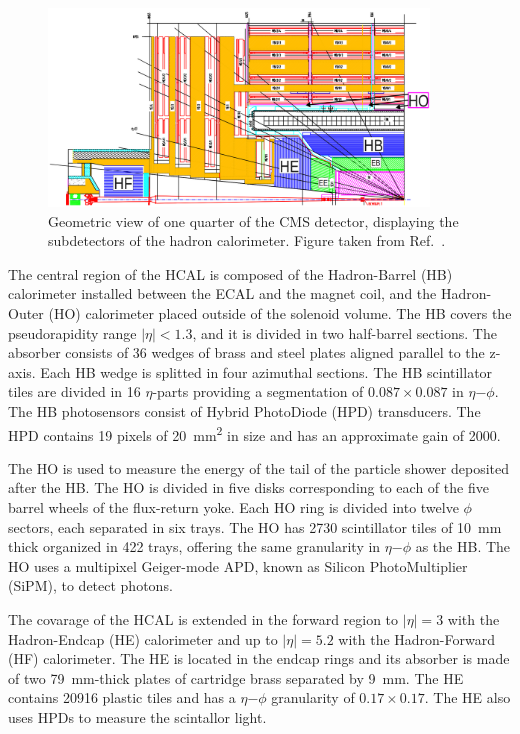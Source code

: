 \begin{figure}[!htbp]
 \begin{center}
  \includegraphics[width=0.9\textwidth]{Figures/Experiment/CMS/HCAL.png}
 \end{center}
 \caption{Geometric view of one quarter of the CMS detector, displaying the subdetectors of the hadron calorimeter. Figure taken from Ref.~\cite{CMSHCALUpgrade}.}
 \label{fig:CMS_HCAL}
\end{figure}

The central region of the HCAL is composed of the Hadron-Barrel (HB) calorimeter installed between the ECAL and the magnet coil, and the Hadron-Outer (HO) calorimeter placed outside of the solenoid volume. The HB covers the pseudorapidity range $|\eta| < 1.3$, and it is divided in two half-barrel sections. The absorber consists of 36 wedges of brass and steel plates aligned parallel to the z-axis. Each HB wedge is splitted in four azimuthal sections. The HB scintillator tiles are divided in 16 $\eta$-parts providing a segmentation of $0.087{\times}0.087$ in $\eta\mathrm{-}\phi$. The HB photosensors consist of  Hybrid PhotoDiode (HPD) transducers. The HPD contains 19 pixels of \SI{20}{\mm\squared} in size and has an approximate gain of 2000.

The HO is used to measure the energy of the tail of the particle shower deposited after the HB. The HO is divided in five disks corresponding to each of the five barrel wheels of the flux-return yoke. Each HO ring is divided into twelve $\phi$ sectors, each separated in six trays. The HO has 2730 scintillator tiles of \SI{10}{\mm} thick organized in 422 trays, offering the same granularity in $\eta\mathrm{-}\phi$ as the HB. The HO uses a multipixel Geiger-mode APD, known as Silicon PhotoMultiplier (SiPM), to detect photons.

The covarage of the HCAL is extended in the forward region to $|\eta| = 3$ with the Hadron-Endcap (HE) calorimeter and up to $|\eta| = 5.2$ with the Hadron-Forward (HF) calorimeter. The HE is located in the endcap rings and its absorber is made of two \SI{79}{\mm}-thick plates of cartridge brass separated by \SI{9}{\mm}. The HE contains 20916 plastic tiles and has a $\eta\mathrm{-}\phi$ granularity of  $0.17{\times}0.17$. The HE also uses HPDs to measure the scintallor light.

